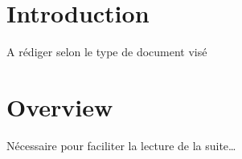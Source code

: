 \documentclass{article}
\begin{document}
\newtheorem{definition}{Definition}
\newtheorem{fact}[definition]{Fact}

\section{Introduction}
A rédiger selon le type de document visé

\section{Overview}
Nécessaire pour faciliter la lecture de la suite\ldots
\end{document}
